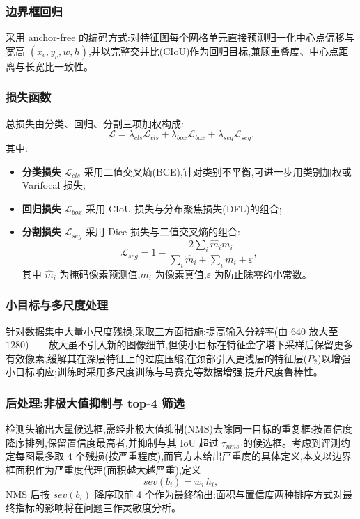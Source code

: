 \subsubsection{边界框回归}

采用 anchor-free 的编码方式:对特征图每个网格单元直接预测归一化中心点偏移与宽高 $(x_c,y_c,w,h)$,并以完整交并比(CIoU)作为回归目标,兼顾重叠度、中心点距离与长宽比一致性。

\subsubsection{损失函数}

总损失由分类、回归、分割三项加权构成:
\[
\mathcal{L}=\lambda_{cls}\mathcal{L}_{cls}+\lambda_{box}\mathcal{L}_{box}+\lambda_{seg}\mathcal{L}_{seg}.
\]
其中:
\begin{itemize}
\item \textbf{分类损失} $\mathcal{L}_{cls}$ 采用二值交叉熵(BCE),针对类别不平衡,可进一步用类别加权或 Varifocal 损失;
\item \textbf{回归损失} $\mathcal{L}_{box}$ 采用 CIoU 损失与分布聚焦损失(DFL)的组合;
\item \textbf{分割损失} $\mathcal{L}_{seg}$ 采用 Dice 损失与二值交叉熵的组合:
\[
\mathcal{L}_{seg}=1-\frac{2\sum_i \hat{m}_i m_i}{\sum_i \hat{m}_i+\sum_i m_i+\varepsilon},
\]
其中 $\hat{m}_i$ 为掩码像素预测值,$m_i$ 为像素真值,$\varepsilon$ 为防止除零的小常数。
\end{itemize}

\subsubsection{小目标与多尺度处理}

针对数据集中大量小尺度残损,采取三方面措施:提高输入分辨率(由 $640$ 放大至 $1280$)——放大虽不引入新的图像细节,但使小目标在特征金字塔下采样后保留更多有效像素,缓解其在深层特征上的过度压缩;在颈部引入更浅层的特征层($P_2$)以增强小目标响应;训练时采用多尺度训练与马赛克等数据增强,提升尺度鲁棒性。

\subsubsection{后处理:非极大值抑制与 top-4 筛选}

检测头输出大量候选框,需经非极大值抑制(NMS)去除同一目标的重复框:按置信度降序排列,保留置信度最高者,并抑制与其 IoU 超过 $\tau_{nms}$ 的候选框。考虑到评测约定每图最多取 4 个残损(按严重程度),而官方未给出严重度的具体定义,本文以边界框面积作为严重度代理(面积越大越严重),定义
\[
sev(b_i)=w_i\,h_i,
\]
NMS 后按 $sev(b_i)$ 降序取前 4 个作为最终输出;面积与置信度两种排序方式对最终指标的影响将在问题三作灵敏度分析。

